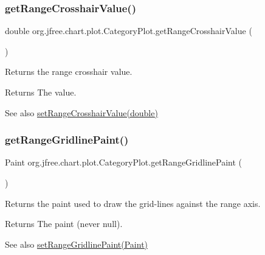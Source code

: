 \subsubsection{\texorpdfstring{get\+Range\+Crosshair\+Value()}{getRangeCrosshairValue()}}
{\footnotesize\ttfamily double org.\+jfree.\+chart.\+plot.\+Category\+Plot.\+get\+Range\+Crosshair\+Value (\begin{DoxyParamCaption}{ }\end{DoxyParamCaption})}

Returns the range crosshair value.

\begin{DoxyReturn}{Returns}
The value.
\end{DoxyReturn}
\begin{DoxySeeAlso}{See also}
\mbox{\hyperlink{classorg_1_1jfree_1_1chart_1_1plot_1_1_category_plot_af4795fd7065e9245eb43140f5adf7fed}{set\+Range\+Crosshair\+Value(double)}} 
\end{DoxySeeAlso}
\mbox{\label{classorg_1_1jfree_1_1chart_1_1plot_1_1_category_plot_abb4101febf21c1537aecd57c3a524250}} 
\subsubsection{\texorpdfstring{get\+Range\+Gridline\+Paint()}{getRangeGridlinePaint()}}
{\footnotesize\ttfamily Paint org.\+jfree.\+chart.\+plot.\+Category\+Plot.\+get\+Range\+Gridline\+Paint (\begin{DoxyParamCaption}{ }\end{DoxyParamCaption})}

Returns the paint used to draw the grid-\/lines against the range axis.

\begin{DoxyReturn}{Returns}
The paint (never {\ttfamily null}).
\end{DoxyReturn}
\begin{DoxySeeAlso}{See also}
\mbox{\hyperlink{classorg_1_1jfree_1_1chart_1_1plot_1_1_category_plot_a8bbe8561afac2e8f929844c173f9d93b}{set\+Range\+Gridline\+Paint(\+Paint)}} 
\end{DoxySeeAlso}
\mbox{\label{classorg_1_1jfree_1_1chart_1_1plot_1_1_category_plot_ae6769196c3c8bad1d58e293103ccc3ea}} 
